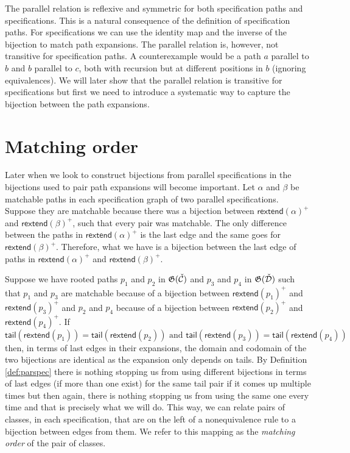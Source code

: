 The parallel relation is reflexive and symmetric for both specification paths and specifications. This is a natural consequence of the definition of specification paths. For specifications we can use the identity map and the inverse of the bijection to match path expansions. The parallel relation is, however, not transitive for specification paths. A counterexample would be a path $a$ parallel to $b$ and $b$ parallel to $c$, both with recursion but at different positions in $b$ (ignoring equivalences). We will later show that the parallel relation is transitive for specifications but first we need to introduce a systematic way to capture the bijection between the path expansions.

\section{Matching order}
Later when we look to construct bijections from parallel specifications in  the bijections used to pair path expansions will become important. Let $\alpha$ and $\beta$ be matchable paths in each specification graph of two parallel specifications. Suppose they are matchable because there was a bijection between $\textsf{rextend}(\alpha)^+$ and $\textsf{rextend}(\beta)^+$, such that every pair was matchable. The only difference between the paths in $\textsf{rextend}(\alpha)^+$ is the last edge and the same goes for $\textsf{rextend}(\beta)^+$. Therefore, what we have is a bijection between the last edge of paths in $\textsf{rextend}(\alpha)^+$ and $\textsf{rextend}(\beta)^+$. 

Suppose we have rooted paths $p_1$ and $p_2$ in $\mathfrak{G}(\check{\mathcal{C}})$ and $p_3$ and $p_4$ in $\mathfrak{G}(\check{\mathcal{D}})$ such that $p_1$ and $p_3$ are matchable because of a bijection between $\textsf{rextend}(p_1)^+$ and $\textsf{rextend}(p_3)^+$ and $p_2$ and $p_4$ because of a bijection between $\textsf{rextend}(p_2)^+$ and $\textsf{rextend}(p_4)^+$. If
\[
    \textsf{tail}(\textsf{rextend}(p_1)) = \textsf{tail}(\textsf{rextend}(p_2)) \text{ and } \textsf{tail}(\textsf{rextend}(p_3))=\textsf{tail}(\textsf{rextend}(p_4))
\]
then, in terms of last edges in their expansions, the domain and codomain of the two bijections are identical as the expansion only depends on tails. By Definition \ref{def:parspec} there is nothing stopping us from using different bijections in terms of last edges (if more than one exist) for the same tail pair if it comes up multiple times but then again, there is nothing stopping us from using the same one every time and that is precisely what we will do. This way, we can relate pairs of classes, in each specification, that are on the left of a nonequivalence rule to a bijection between edges from them. We refer to this mapping as the \emph{matching order} of the pair of classes.

